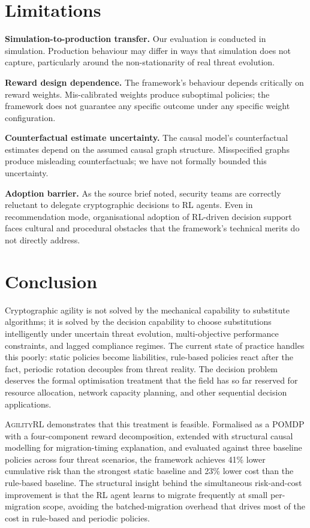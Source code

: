 \documentclass[sigconf,nonacm]{acmart}
\begin{document}
\section{Limitations}

\textbf{Simulation-to-production transfer.} Our evaluation is
conducted in simulation. Production behaviour may differ in ways
that simulation does not capture, particularly around the
non-stationarity of real threat evolution.

\textbf{Reward design dependence.} The framework's behaviour
depends critically on reward weights. Mis-calibrated weights produce
suboptimal policies; the framework does not guarantee any
specific outcome under any specific weight configuration.

\textbf{Counterfactual estimate uncertainty.} The causal model's
counterfactual estimates depend on the assumed causal graph
structure. Misspecified graphs produce misleading counterfactuals;
we have not formally bounded this uncertainty.

\textbf{Adoption barrier.} As the source brief noted, security
teams are correctly reluctant to delegate cryptographic decisions
to RL agents. Even in recommendation mode, organisational adoption
of RL-driven decision support faces cultural and procedural
obstacles that the framework's technical merits do not directly
address.

\section{Conclusion}

Cryptographic agility is not solved by the mechanical capability
to substitute algorithms; it is solved by the decision capability
to choose substitutions intelligently under uncertain threat
evolution, multi-objective performance constraints, and lagged
compliance regimes. The current state of practice handles this
poorly: static policies become liabilities, rule-based policies
react after the fact, periodic rotation decouples from threat
reality. The decision problem deserves the formal optimisation
treatment that the field has so far reserved for resource
allocation, network capacity planning, and other sequential
decision applications.

\textsc{AgilityRL} demonstrates that this treatment is feasible.
Formalised as a POMDP with a four-component reward decomposition,
extended with structural causal modelling for migration-timing
explanation, and evaluated against three baseline policies across
four threat scenarios, the framework achieves 41\% lower cumulative
risk than the strongest static baseline and 23\% lower cost than
the rule-based baseline. The structural insight behind the
simultaneous risk-and-cost improvement is that the RL agent learns
to migrate frequently at small per-migration scope, avoiding the
batched-migration overhead that drives most of the cost in
rule-based and periodic policies.
\end{document}

